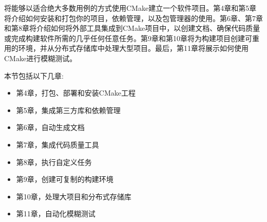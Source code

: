 将能够以适合绝大多数用例的方式使用CMake建立一个软件项目。第4章和第5章将介绍如何安装和打包你的项目，依赖管理，以及包管理器的使用。第6章、第7章和第8章将介绍如何将外部工具集成到CMake项目中，以创建文档、确保代码质量或完成构建软件所需的几乎任何任意任务。第9章和第10章将为构建项目创建可重用的环境，并从分布式存储库中处理大型项目。最后，第11章将展示如何使用CMake进行模糊测试。

本节包括以下几章:

\begin{itemize}
\item 第4章，打包、部署和安装CMake工程
\item 第5章，集成第三方库和依赖管理
\item 第6章，自动生成文档
\item 第7章，集成代码质量工具
\item 第8章，执行自定义任务
\item 第9章，创建可复制的构建环境
\item 第10章，处理大项目和分布式存储库
\item 第11章，自动化模糊测试
\end{itemize}